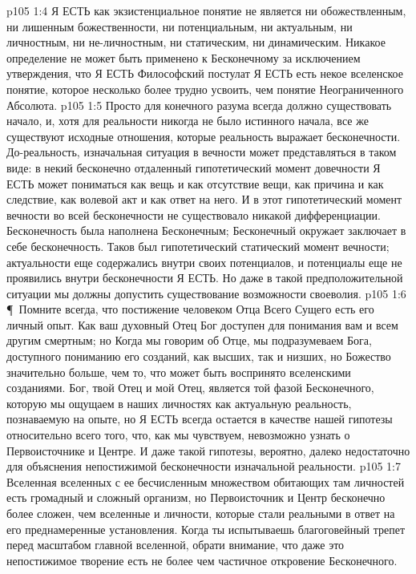 \vs p105 1:4 Я ЕСТЬ как экзистенциальное понятие не является ни обожествленным, ни лишенным божественности, ни потенциальным, ни актуальным, ни личностным, ни не\hyp{}личностным, ни статическим, ни динамическим. Никакое определение не может быть применено к Бесконечному за исключением утверждения, что Я ЕСТЬ  Философский постулат Я ЕСТЬ есть некое вселенское понятие, которое несколько более трудно усвоить, чем понятие Неограниченного Абсолюта.
\vs p105 1:5 Просто для конечного разума всегда должно существовать начало, и, хотя для реальности никогда не было истинного начала, все же существуют исходные отношения, которые реальность выражает бесконечности. До\hyp{}реальность, изначальная ситуация в вечности может представляться в таком виде: в некий бесконечно отдаленный гипотетический момент довечности Я ЕСТЬ может пониматься как вещь и как отсутствие вещи, как причина и как следствие, как волевой акт и как ответ на него. И в этот гипотетический момент вечности во всей бесконечности не существовало никакой дифференциации. Бесконечность была наполнена Бесконечным; Бесконечный окружает заключает в себе бесконечность. Таков был гипотетический статический момент вечности; актуальности еще содержались внутри своих потенциалов, и потенциалы еще не проявились внутри бесконечности Я ЕСТЬ. Но даже в такой предположительной ситуации мы должны допустить существование возможности своеволия.
\vs p105 1:6 \P\ Помните всегда, что постижение человеком Отца Всего Сущего есть его личный опыт. Как ваш духовный Отец Бог доступен для понимания вам и всем другим смертным; но  Когда мы говорим об Отце, мы подразумеваем Бога, доступного пониманию его созданий, как высших, так и низших, но Божество значительно больше, чем то, что может быть воспринято вселенскими созданиями. Бог, твой Отец и мой Отец, является той фазой Бесконечного, которую мы ощущаем в наших личностях как актуальную реальность, познаваемую на опыте, но Я ЕСТЬ всегда остается в качестве нашей гипотезы относительно всего того, что, как мы чувствуем, невозможно узнать о Первоисточнике и Центре. И даже такой гипотезы, вероятно, далеко недостаточно для объяснения непостижимой бесконечности изначальной реальности.
\vs p105 1:7 Вселенная вселенных с ее бесчисленным множеством обитающих там личностей есть громадный и сложный организм, но Первоисточник и Центр бесконечно более сложен, чем вселенные и личности, которые стали реальными в ответ на его преднамеренные установления. Когда ты испытываешь благоговейный трепет перед масштабом главной вселенной, обрати внимание, что даже это непостижимое творение есть не более чем частичное откровение Бесконечного.

